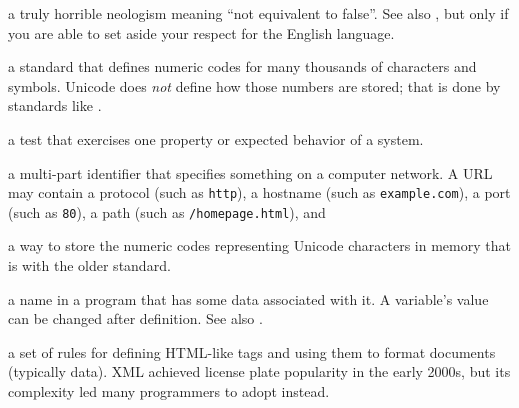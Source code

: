 \begin{description}
a truly horrible neologism meaning ``not equivalent to false''. See also
, but only if you are able to set aside your respect for the
English language.

a standard that defines numeric codes for many thousands of characters and
symbols. Unicode does \emph{not} define how those numbers are stored; that is done
by standards like .

a test that exercises one property or expected behavior of a system.

a multi-part identifier that specifies something on a computer network. A URL
may contain a protocol (such as \texttt{http}), a hostname (such as \texttt{example.com}), a
port (such as \texttt{80}), a path (such as \texttt{/homepage.html}), and 

a way to store the numeric codes representing Unicode characters in memory
that is  with the older
 standard.

a name in a program that has some data associated with it. A variable's value
can be changed after definition. See also .

a set of rules for defining HTML-like tags and using them to format documents
(typically data). XML achieved license plate popularity in the early 2000s,
but its complexity led many programmers to adopt  instead.

\end{description}
